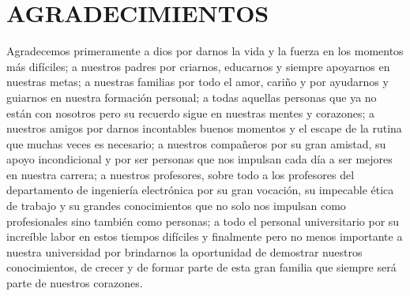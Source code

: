 
\section*{AGRADECIMIENTOS}

    Agradecemos primeramente a dios por darnos la vida y la  fuerza en los momentos
    más difíciles; a nuestros padres por criarnos, educarnos y siempre apoyarnos en
    nuestras metas; a nuestras familias por todo el amor, cariño y por ayudarnos y
    guiarnos en nuestra formación personal; a todas aquellas personas que ya no
    están con nosotros pero su recuerdo sigue en nuestras mentes y corazones; a
    nuestros amigos por darnos incontables buenos momentos y el escape de la rutina
    que muchas veces es necesario; a nuestros compañeros por su gran amistad, su
    apoyo incondicional y por ser personas que nos impulsan cada día a ser mejores
    en nuestra carrera; a nuestros profesores, sobre todo a los profesores del
    departamento de ingeniería electrónica por su gran vocación, su impecable ética
    de trabajo y su grandes conocimientos que no solo nos impulsan como
    profesionales sino también como  personas; a todo el personal universitario por
    su increíble labor en estos tiempos difíciles y finalmente pero no menos
    importante a nuestra universidad por brindarnos la oportunidad de demostrar
    nuestros conocimientos, de crecer y de formar parte de esta gran familia que
    siempre será parte de nuestros corazones.

